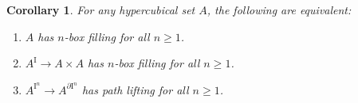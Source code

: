 \documentclass[11pt]{article}
\newcommand{\I}{\ensuremath{\mathrm{I}}}
\newcommand{\type}{\mathsf{type}}
\newcommand{\Id}{\mathsf{Id}}
\newcommand{\id}[1]{\Id_{#1}}
\newcommand{\refl}{\mathsf{refl}}
\newtheorem{theorem}{Theorem}
\newtheorem{corollary}[theorem]{Corollary}
\theoremstyle{remark}
\theoremstyle{definition}
\begin{document}
\begin{corollary}\label{cor:alln}
For any hypercubical set $A$, the following are equivalent:
\begin{enumerate}
\item $A$ has $n$-box filling for all $n\geq 1$.
\item $A^\I \to A\times A$ has $n$-box filling for all $n\geq 1$.
\item $A^{\I^n} \to A^{\partial\I^n}$ has path lifting for all $n\geq 1$.
\end{enumerate}
\end{corollary}

%

%
\end{document}
